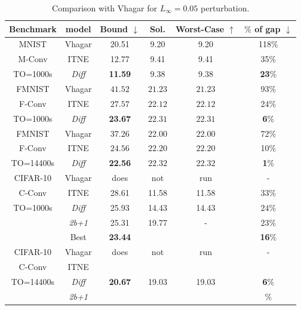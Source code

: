 \begin{table}[h!]
	\centering
	\begin{tabular}{||c||c|c|c|c|c||}\hline\hline
	Benchmark & model & Bound $\downarrow$ &  Sol. &      Worst-Case $\uparrow$ & $\%$ of gap $\downarrow$ \\\hline \hline
	MNIST   & Vhagar & 20.51 & 9.20 & 9.20 & 118$\%$
    \\
	M-Conv & ITNE & 12.77 & 9.41 & 9.41 & 35$\%$
	\\ 
    TO=1000s & {\em Diff} & {\bf 11.59}  & 9.38 & 9.38 & {\bf 23$\%$}
    \\\hline \hline

	FMNIST & Vhagar &  $41.52$ & $21.23$ & $21.23$ & 93$\%$ 
    \\
	F-Conv  & ITNE &  $27.57$ &  $22.12$ & $22.12$ & 24$\%$
	\\ 
    TO=1000s & {\em Diff} &  {\bf 23.67} &  $22.31$ &  $22.31$ & {\bf 6$\%$}
    \\\hline 


	FMNIST & Vhagar &  $37.26$ &  $22.00$ & $22.00$ & 72$\%$
    \\
	F-Conv  & ITNE &  $24.56$ &  $22.20$ & $22.20$ & 10$\%$
	\\ 
    TO=14400s & {\em Diff} &    {\bf 22.56} &  $22.32$ &  $22.32$ & {\bf 1$\%$}
    \\\hline \hline
	
	CIFAR-10  & Vhagar & does & not & run & -
    \\
	C-Conv  & ITNE & 28.61 & 11.58 & 11.58 & $33\%$
	\\ 
    TO=1000s & {\em Diff} &  25.93  & 14.43 & 14.43 & $24\%$
	\\
	& {\em 2b+1} &  25.31 & 19.77 & - & $23\%$
	\\
	& Best &  {\bf 23.44}  &  &  & {\bf 16}$\%$
    \\\hline
    
	CIFAR-10  & Vhagar & does & not & run & -
    \\
	C-Conv  & ITNE &  & & &
	\\ 
    TO=14400s & {\em Diff} &  {\bf 20.67}  & 19.03 & 19.03 & {\bf 6}$\%$
	\\
	 & {\em 2b+1} &  {\bf }  &  &  & $\%$
    \\\hline \hline
    

     \end{tabular}
	\caption{Comparison with Vhagar for $L_\infty=0.05$ perturbation.}
    \label{table.classical}
\end{table}


